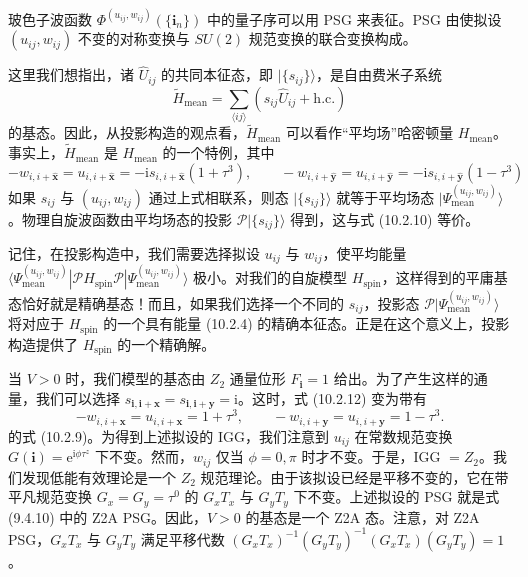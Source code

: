 玻色子波函数 $\Phi^{(u_{ij},w_{ij})}(\{\pmb{i}_n\})$ 中的量子序可以用 PSG 来表征。PSG 由使拟设 $(u_{ij},w_{ij})$ 不变的对称变换与 $SU(2)$ 规范变换的联合变换构成。

这里我们想指出，诸 $\hat U_{ij}$ 的共同本征态，即 $|\{s_{ij}\}\rangle$，是自由费米子系统
\begin{equation*}
\tilde H_{\text{mean}}=\sum_{\langle ij\rangle}\left(s_{ij}\hat U_{ij}+\text{h.c.}\right)
\tag{10.2.12}
\end{equation*}
的基态。因此，从投影构造的观点看，$\tilde H_{\text{mean}}$ 可以看作“平均场”哈密顿量 $H_{\text{mean}}$。事实上，$\tilde H_{\text{mean}}$ 是 $H_{\text{mean}}$ 的一个特例，其中
\begin{equation*}
-w_{i,i+\hat{\pmb{x}}}=u_{i,i+\hat{\pmb{x}}}=-\mathrm{i}s_{i,i+\hat{\pmb{x}}}(1+\tau^{3}),\qquad
-w_{i,i+\hat{\pmb{y}}}=u_{i,i+\hat{\pmb{y}}}=-\mathrm{i}s_{i,i+\hat{\pmb{y}}}(1-\tau^{3})
\end{equation*}
如果 $s_{ij}$ 与 $(u_{ij},w_{ij})$ 通过上式相联系，则态 $|\{s_{ij}\}\rangle$ 就等于平均场态 $|\Psi^{(u_{ij},w_{ij})}_{\text{mean}}\rangle$。物理自旋波函数由平均场态的投影 $\mathcal{P}|\{s_{ij}\}\rangle$ 得到，这与式 (10.2.10) 等价。

记住，在投影构造中，我们需要选择拟设 $u_{ij}$ 与 $w_{ij}$，使平均能量 $\langle\Psi^{(u_{ij},w_{ij})}_{\text{mean}}|\mathcal{P}H_{\text{spin}}\mathcal{P}|\Psi^{(u_{ij},w_{ij})}_{\text{mean}}\rangle$ 极小。对我们的自旋模型 $H_{\text{spin}}$，这样得到的平庸基态恰好就是精确基态！而且，如果我们选择一个不同的 $s_{ij}$，投影态 $\mathcal{P}|\Psi^{(u_{ij},w_{ij})}_{\text{mean}}\rangle$ 将对应于 $H_{\text{spin}}$ 的一个具有能量 (10.2.4) 的精确本征态。正是在这个意义上，投影构造提供了 $H_{\text{spin}}$ 的一个精确解。

当 $V>0$ 时，我们模型的基态由 $Z_2$ 通量位形 $F_{\pmb{i}}=1$ 给出。为了产生这样的通量，我们可以选择 $s_{\pmb{i},\pmb{i}+\pmb{x}}=s_{\pmb{i},\pmb{i}+\pmb{y}}=\mathrm{i}$。这时，式 (10.2.12) 变为带有
\begin{equation*}
-w_{i,i+\pmb{x}}=u_{i,i+\pmb{x}}=1+\tau^{3},\qquad
-w_{i,i+\pmb{y}}=u_{i,i+\pmb{y}}=1-\tau^{3}.
\end{equation*}
的式 (10.2.9)。为得到上述拟设的 IGG，我们注意到 $u_{ij}$ 在常数规范变换 $G(\pmb{i})=\mathrm{e}^{\mathrm{i}\phi\tau^{z}}$ 下不变。然而，$w_{ij}$ 仅当 $\phi=0,\pi$ 时才不变。于是，IGG $=Z_2$。我们发现低能有效理论是一个 $Z_2$ 规范理论。由于该拟设已经是平移不变的，它在带平凡规范变换 $G_x=G_y=\tau^{0}$ 的 $G_xT_x$ 与 $G_yT_y$ 下不变。上述拟设的 PSG 就是式 (9.4.10) 中的 Z2A PSG。因此，$V>0$ 的基态是一个 Z2A 态。注意，对 Z2A PSG，$G_xT_x$ 与 $G_yT_y$ 满足平移代数 $(G_xT_x)^{-1}(G_yT_y)^{-1}(G_xT_x)(G_yT_y)=1$。

